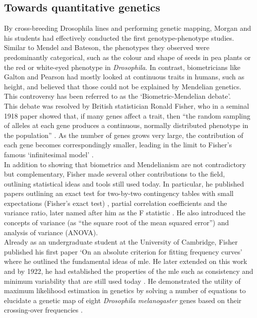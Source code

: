 \subsection{Towards quantitative genetics} %
\label{sec:Fisher}

By cross-breeding Drosophila lines and performing genetic mapping, Morgan and his students had effectively conducted the first genotype-phenotype studies. 
Similar to Mendel and Bateson, the phenotypes they observed were predominantly categorical, such as the colour and shape of seeds in pea plants or the red or white-eyed phenotype in \textit{Drosophila}. 
In contrast, biometricians like Galton and Pearson had mostly looked at continuous traits in humans, such as height, and believed that those could not be explained by Mendelian genetics.
This controversy has been referred to as the `Biometric-Mendelian debate'.\\ 

This debate was resolved by British statistician Ronald Fisher, who in a seminal 1918 paper showed that, if many genes affect a trait, then “the random sampling of alleles at each gene produces a continuous, normally distributed phenotype in the population” \cite{fisher1919xv}. 
As the number of genes grows very large, the contribution of each gene becomes correspondingly smaller, leading in the limit to Fisher’s famous `infinitesimal model' \cite{barton2017infinitesimal}.\\

In addition to showing that biometrics and Mendelianism are not contradictory but complementary, Fisher made several other contributions to the field, outlining statistical ideas and tools still used today. 
In particular, he published papers outlining an exact test for two-by-two contingency tables with small expectations (Fisher’s exact test) \cite{fisher1922interpretation}, partial correlation coefficients \cite{fisher1924distribution} and the variance ratio, later named after him as the F statistic \cite{fisher1924036}. 
He also introduced the concepts of variance (as “the square root of the mean squared error”) and analysis of variance (ANOVA). \\

Already as an undergraduate student at the University of Cambridge, Fisher published his first paper `On an absolute criterion for fitting frequency curves' where he outlined the fundamental ideas of \gls{mle}. 
He later extended on this work and by 1922, he had established the properties of the \gls{mle} such as consistency and minimum variability \cite{fisher1922mathematical} that are still used today \cite{hald1999history}. 
He demonstrated the utility of maximum likelihood estimation in genetics by solving a number of equations to elucidate a genetic map of eight \textit{Drosophila melanogaster} genes based on their crossing-over frequencies \cite{fisher1922systematic}.\\

